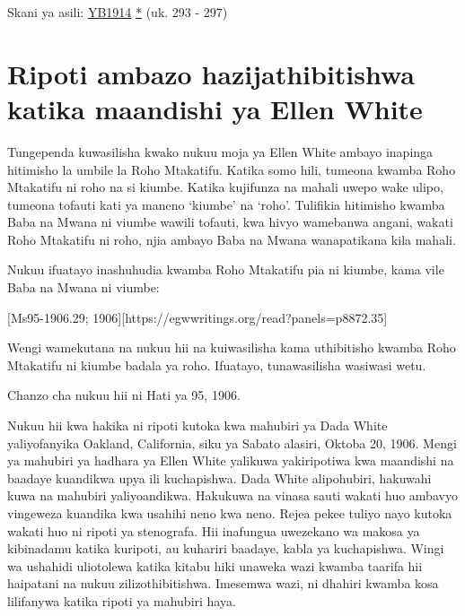 Skani ya asili: \href{https://documents.adventistarchives.org/Yearbooks/YB1914.pdf#search=Yearbook%201914}{YB1914} \href{https://forgotten-pillar.s3.us-east-2.amazonaws.com/YB1914.pdf}{*} (uk. 293 - 297)

\section*{Ripoti ambazo hazijathibitishwa katika maandishi ya Ellen White}

\label{appendix:unauthenticated-reports}
Tungependa kuwasilisha kwako nukuu moja ya Ellen White ambayo inapinga hitimisho la umbile la Roho Mtakatifu. Katika somo hili, tumeona kwamba Roho Mtakatifu ni roho na si kiumbe. Katika kujifunza  na mahali uwepo wake ulipo, tumeona tofauti kati ya maneno ‘kiumbe’ na ‘roho’. Tulifikia hitimisho kwamba Baba na Mwana ni viumbe wawili tofauti, kwa hivyo wamebanwa angani, wakati Roho Mtakatifu ni roho, njia ambayo Baba na Mwana wanapatikana kila mahali.

Nukuu ifuatayo inashuhudia kwamba Roho Mtakatifu pia ni kiumbe, kama vile Baba na Mwana ni viumbe:

[Ms95-1906.29; 1906][https://egwwritings.org/read?panels=p8872.35]

Wengi wamekutana na nukuu hii na kuiwasilisha kama uthibitisho kwamba Roho Mtakatifu ni kiumbe badala ya roho. Ifuatayo, tunawasilisha wasiwasi wetu.

Chanzo cha nukuu hii ni Hati ya 95, 1906.

Nukuu hii kwa hakika ni ripoti kutoka kwa mahubiri ya Dada White yaliyofanyika Oakland, California, siku ya Sabato alasiri, Oktoba 20, 1906. Mengi ya mahubiri ya hadhara ya Ellen White yalikuwa yakiripotiwa kwa maandishi na baadaye kuandikwa upya ili kuchapishwa. Dada White alipohubiri, hakuwahi kuwa na mahubiri yaliyoandikwa. Hakukuwa na vinasa sauti wakati huo ambavyo vingeweza kuandika kwa usahihi neno kwa neno. Rejea pekee tuliyo nayo kutoka wakati huo ni ripoti ya stenografa. Hii inafungua uwezekano wa makosa ya kibinadamu katika kuripoti, au kuhariri baadaye, kabla ya kuchapishwa. Wingi wa ushahidi uliotolewa katika kitabu hiki unaweka wazi kwamba taarifa hii haipatani na nukuu zilizothibitishwa. Imesemwa wazi, ni dhahiri kwamba kosa lilifanywa katika ripoti ya mahubiri haya.

